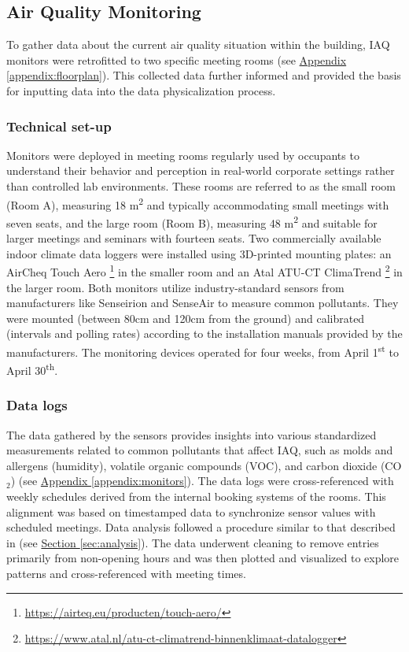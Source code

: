 \newpage

\subsection{Air Quality Monitoring}
\label{sec:monitoring}

To gather data about the current air quality situation within the building, IAQ monitors were retrofitted to two specific meeting rooms (see \hyperref[appendix:floorplan]{Appendix \ref*{appendix:floorplan}}). This collected data further informed and provided the basis for inputting data into the data physicalization process.

\subsubsection{Technical set-up}

Monitors were deployed in meeting rooms regularly used by occupants to understand their behavior and perception in real-world corporate settings rather than controlled lab environments. These rooms are referred to as the small room (Room A), measuring 18 m\textsuperscript{2} and typically accommodating small meetings with seven seats, and the large room (Room B), measuring 48 m\textsuperscript{2} and suitable for larger meetings and seminars with fourteen seats. Two commercially available indoor climate data loggers were installed using 3D-printed mounting plates: an AirCheq Touch Aero \footnote{\url{https://airteq.eu/producten/touch-aero/}} in the smaller room and an Atal ATU-CT ClimaTrend \footnote{\url{https://www.atal.nl/atu-ct-climatrend-binnenklimaat-datalogger}} in the larger room. Both monitors utilize industry-standard sensors from manufacturers like Senseirion and SenseAir to measure common pollutants. They were mounted (between 80cm and 120cm from the ground) and calibrated (intervals and polling rates) according to the installation manuals provided by the manufacturers. The monitoring devices operated for four weeks, from April 1\textsuperscript{st} to April 30\textsuperscript{th}.

\subsubsection{Data logs}

The data gathered by the sensors provides insights into various standardized measurements related to common pollutants that affect IAQ, such as molds and allergens (humidity), volatile organic compounds (VOC), and carbon dioxide (CO$_{2}$) (see \hyperref[appendix:monitors]{Appendix \ref*{appendix:monitors}}). The data logs were cross-referenced with weekly schedules derived from the internal booking systems of the rooms. This alignment was based on timestamped data to synchronize sensor values with scheduled meetings. Data analysis followed a procedure similar to that described in (see \hyperref[{sec:analysis}]{Section \ref*{sec:analysis}}). The data underwent cleaning to remove entries primarily from non-opening hours and was then plotted and visualized to explore patterns and cross-referenced with meeting times.

